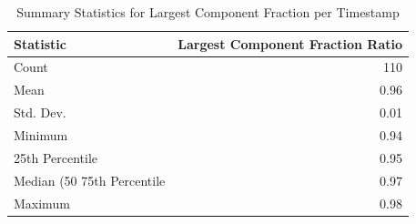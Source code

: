 \begin{table}[htbp]
\centering
\caption{Summary Statistics for Largest Component Fraction per Timestamp}
\label{tab:contiguity_largest_component_fraction}
\begin{tabular}{lr}
\toprule
Statistic & Largest Component Fraction Ratio \\
\midrule
Count & 110 \\
Mean & 0.96 \\
Std. Dev. & 0.01 \\
Minimum & 0.94 \\
25th Percentile & 0.95 \\
Median (50%
75th Percentile & 0.97 \\
Maximum & 0.98 \\
\bottomrule
\end{tabular}
\end{table}
